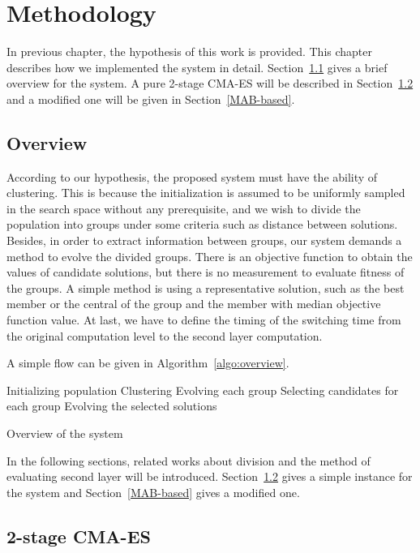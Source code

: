 \chapter{Methodology} \label{ch:method}

In previous chapter, the hypothesis of this work is provided.
This chapter describes how we implemented the system in detail.
Section~\ref{sec:overview}
gives a brief overview for the system.
A pure 2-stage CMA-ES will be described in Section~\ref{sec:2layer} and a
modified one will be given in Section~\ref{MAB-based}.

\section{Overview} \label{sec:overview}

According to our hypothesis, the proposed system must have the ability of
clustering.
This is because the initialization is assumed to be uniformly
sampled in the search space without any prerequisite, and we wish to divide the
population into groups under some criteria such as distance between solutions.
Besides, in order to extract information between groups, our system
demands a method to evolve the divided groups.
There is an objective function to obtain the values of candidate
solutions, but there is no measurement to evaluate fitness of the
groups.
A simple method is using a representative solution, such as the best
member or the central of the group and the member with median objective
function value.
At last, we have to define the timing of the switching time from the
original computation level to the second layer computation. 

A simple flow can be given in Algorithm~\ref{algo:overview}.

\begin{algorithm}[H]
  \label{algo:overview}
  Initializing population\;
	Clustering\;
  {
    {
    Evolving each group\;
    }
    Selecting candidates for each group\;
    Evolving the selected solutions\;
  }
  \caption{Overview of the system}
\end{algorithm}
In the following sections, related works about
division and the method of evaluating second layer will be introduced.
Section~\ref{sec:2layer}
gives a simple instance for the system and Section~\ref{MAB-based} gives a
modified one.

\section{2-stage CMA-ES} \label{sec:2layer}

